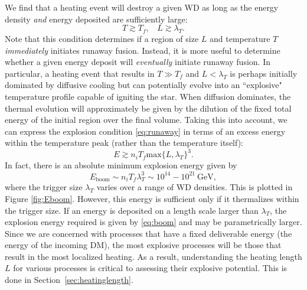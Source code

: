 \documentclass[twocolumn,showpacs,preprintnumbers,amsmath,amssymb,prd]{revtex4}
\newcommand{\GeV}{\text{GeV}}
\begin{document}
We find that a heating event will destroy a given WD as long as the energy density \emph{and} energy deposited are sufficiently large:
\begin{equation}
\label{eq:runaway}
T \gtrsim T_f, ~~~~ L \gtrsim \lambda_T.
\end{equation}
Note that this condition determines if a region of size $L$ and temperature $T$ \emph{immediately} initiates runaway fusion.  Instead, it is more useful to determine whether a given energy deposit will \emph{eventually} initiate runaway fusion. In particular, a heating event that results in $T \gg T_f$ and $L  < \lambda_T$ is perhaps initially dominated by diffusive cooling but can potentially evolve into an ``explosive" temperature profile capable of igniting the star. When diffusion dominates, the thermal evolution will approximately be given by the dilution of the fixed total energy of the initial region over the final volume. Taking this into account, we can express the explosion condition \eqref{eq:runaway} in terms of an excess energy within the temperature peak (rather than the temperature itself):
\begin{equation}
\label{eq:boom}
E \gtrsim n_i T_f \text{max}\{L, \lambda_T\}^3.
\end{equation}
In fact, there is an absolute minimum explosion energy given by
\begin{equation}
E_{\text{boom}} \sim n_i T_f \lambda_T^3 \sim 10^{14} - 10^{21} ~\GeV,
\end{equation}
where the trigger size $\lambda_T$ varies over a range of WD densities. This is plotted in Figure \ref{fig:Eboom}. However, this energy is sufficient only if it thermalizes within the trigger size.  If an energy is deposited on a length scale larger than $\lambda_T$, the explosion energy required is given by \eqref{eq:boom} and may be parametrically larger. Since we are concerned with processes that have a fixed deliverable energy (the energy of the incoming DM), the most explosive processes will be those that result in the most localized heating. As a result, understanding the heating length $L$ for various processes is critical to assessing their explosive potential. This is done in Section~\ref{sec:heatinglength}.
\end{document}
